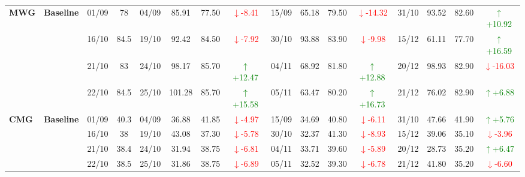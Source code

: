 {\begin{longtable}{llcc|cccc|cccc|cccc}
\multirow{4}{*}{\textbf{MWG}}
& \textbf{Baseline}
& 01/09 & 78 & 04/09 & 85.91 & 77.50 & \textcolor{red}{\(\downarrow\)-8.41} & 15/09 & 65.18 & 79.50 & \textcolor{red}{\(\downarrow\)-14.32} & 31/10 & 93.52 & 82.60 & \textcolor{green}{\(\uparrow\)+10.92} \\
& & 16/10 & 84.5 & 19/10 & 92.42 & 84.50 & \textcolor{red}{\(\downarrow\)-7.92} & 30/10 & 93.88 & 83.90 & \textcolor{red}{\(\downarrow\)-9.98} & 15/12 & 61.11 & 77.70 & \textcolor{green}{\(\uparrow\)+16.59} \\
& & 21/10 & 83 & 24/10 & 98.17 & 85.70 & \textcolor{green}{\(\uparrow\)+12.47} & 04/11 & 68.92 & 81.80 & \textcolor{green}{\(\uparrow\)+12.88} & 20/12 & 98.93 & 82.90 & \textcolor{red}{\(\downarrow\)-16.03} \\
& & 22/10 & 84.5 & 25/10 & 101.28 & 85.70 & \textcolor{green}{\(\uparrow\)+15.58} & 05/11 & 63.47 & 80.20 & \textcolor{green}{\(\uparrow\)+16.73} & 21/12 & 76.02 & 82.90 & \textcolor{green}{\(\uparrow\)+6.88} \\
\midrule

\multirow{4}{*}{\textbf{CMG}}
& \textbf{Baseline}
& 01/09 & 40.3 & 04/09 & 36.88 & 41.85 & \textcolor{red}{\(\downarrow\)-4.97} & 15/09 & 34.69 & 40.80 & \textcolor{red}{\(\downarrow\)-6.11} & 31/10 & 47.66 & 41.90 & \textcolor{green}{\(\uparrow\)+5.76} \\
& & 16/10 & 38 & 19/10 & 43.08 & 37.30 & \textcolor{red}{\(\downarrow\)-5.78} & 30/10 & 32.37 & 41.30 & \textcolor{red}{\(\downarrow\)-8.93} & 15/12 & 39.06 & 35.10 & \textcolor{red}{\(\downarrow\)-3.96} \\
& & 21/10 & 38.4 & 24/10 & 31.94 & 38.75 & \textcolor{red}{\(\downarrow\)-6.81} & 04/11 & 33.71 & 39.60 & \textcolor{red}{\(\downarrow\)-5.89} & 20/12 & 28.73 & 35.20 & \textcolor{green}{\(\uparrow\)+6.47} \\
& & 22/10 & 38.5 & 25/10 & 31.86 & 38.75 & \textcolor{red}{\(\downarrow\)-6.89} & 05/11 & 32.52 & 39.30 & \textcolor{red}{\(\downarrow\)-6.78} & 21/12 & 41.80 & 35.20 & \textcolor{red}{\(\downarrow\)-6.60} \\
\midrule


\end{longtable}}
